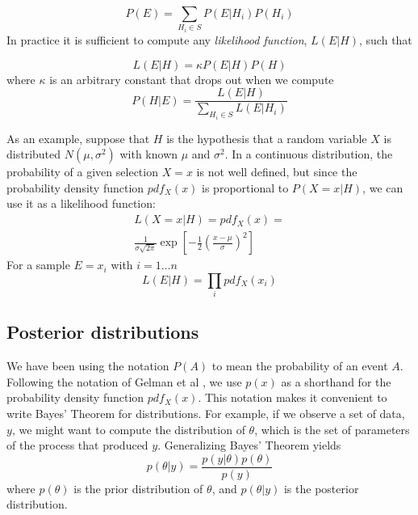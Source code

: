 \documentclass[twocolumn,11pt]{article}
\begin{document}
\begin{equation}
P(E) = \sum_{H_i \in S} P(E|H_i) P(H_i)
\end{equation}
%
In practice it is sufficient to compute any {\em likelihood function},
$L(E|H)$, such that

\begin{equation}
L(E|H) = \kappa P(E|H) P(H)
\end{equation}
%
where $\kappa$ is an arbitrary constant that drops out when we
compute
%
\begin{equation}
P(H|E) = \frac{L(E|H)}{\sum_{H_i \in S} L(E|H_i)}
\end{equation}

As an example, suppose that $H$ is the hypothesis that a random
variable $X$ is distributed $N(\mu,\sigma^2)$ with known $\mu$ and
$\sigma^2$.  
In a continuous distribution, the probability of a given selection
$X=x$ is not well defined, but since the probability density function
$pdf_X(x)$ is proportional to $P(X=x|H)$, we can use it as a
likelihood function:
%
\begin{multline}
L(X=x|H) = pdf_X(x) =\\
         \frac{1}{\sigma \sqrt{2 \pi}} 
\exp \left[ -\frac{1}{2} \left( \frac{x - \mu}{\sigma} \right) ^2 \right]
\end{multline}
%
For a sample $E = x_i$ with $i = 1 \ldots n$
%
\begin{equation}
L(E|H) = \prod_i pdf_X(x_i)
\end{equation}
%

\subsection{Posterior distributions}

We have been using the notation $P(A)$ to mean the probability of an
event $A$.  Following the notation of Gelman et al
\cite{gelman03bayesian}, we use $p(x)$ as a shorthand for the
probability density function $pdf_X(x)$.  This notation makes it
convenient to write Bayes' Theorem for distributions.  For example,
if we observe a set of data, $y$, we might want to compute the
distribution of $\theta$, which is the set of parameters of the
process that produced $y$.  Generalizing Bayes' Theorem yields
%
\begin{equation}
p(\theta|y) = \frac{p(y|\theta) p(\theta)}{p(y)}
\end{equation}
%
where $p(\theta)$ is the prior distribution
of $\theta$, and $p(\theta|y)$ is the posterior distribution.
\end{document}
